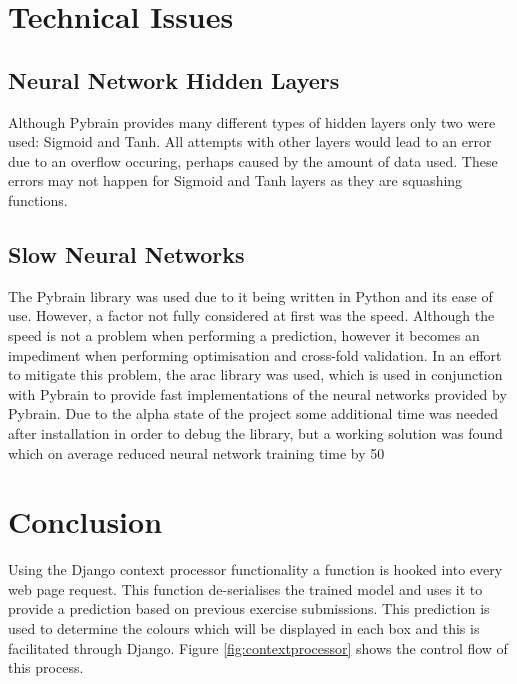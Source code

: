\section{Technical Issues}

\subsection{Neural Network Hidden Layers}
Although Pybrain provides many different types of hidden layers only two were used: Sigmoid and Tanh. All attempts with other layers would lead to an error due to an overflow occuring, perhaps caused by the amount of data used. These errors may not happen for Sigmoid and Tanh layers as they are squashing functions.

\subsection{Slow Neural Networks}
The Pybrain library was used due to it being written in Python and its ease of use. However, a factor not fully considered at first was the speed. Although the speed is not a problem when performing a prediction, however it becomes an impediment when performing optimisation and cross-fold validation. In an effort to mitigate this problem, the arac library\cite{arac_site} was used, which is used in conjunction with Pybrain to provide fast implementations of the neural networks provided by Pybrain. Due to the alpha state of the project some additional time was needed after installation in order to debug the library, but a working solution was found which on average reduced neural network training time by 50%

\section{Conclusion}
Using the Django context processor functionality a function is hooked into every web page request. This function de-serialises the trained model and uses it to provide a prediction based on previous exercise submissions. This prediction is used to determine the colours which will be displayed in each box and this is facilitated through Django. Figure \ref{fig:contextprocessor} shows the control flow of this process.

